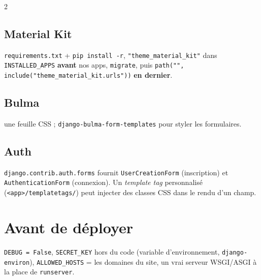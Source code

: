 \documentclass[a4paper,10pt]{article}
\newcommand{\co}[1]{\texttt{\textcolor{codefg}{#1}}}
\begin{document}
\begin{multicols}{2}
\subsection{Material Kit} \co{requirements.txt} + \co{pip install -r},
\co{"theme\_material\_kit"} dans \co{INSTALLED\_APPS} \textbf{avant} nos apps,
\co{migrate}, puis \co{path("", include("theme\_material\_kit.urls"))}
\textbf{en dernier}.

\subsection{Bulma} une feuille CSS ; \co{django-bulma-form-templates} pour
styler les formulaires.

\subsection{Auth} \co{django.contrib.auth.forms} fournit
\co{UserCreationForm} (inscription) et \co{AuthenticationForm} (connexion).
Un \emph{template tag} personnalisé (\co{<app>/templatetags/}) peut injecter
des classes CSS dans le rendu d'un champ.

\section{Avant de déployer}

\co{DEBUG = False}, \co{SECRET\_KEY} hors du code (variable d'environnement,
\co{django-environ}), \co{ALLOWED\_HOSTS} = les domaines du site, un vrai
serveur WSGI/ASGI à la place de \co{runserver}.

\end{multicols}
\end{document}
